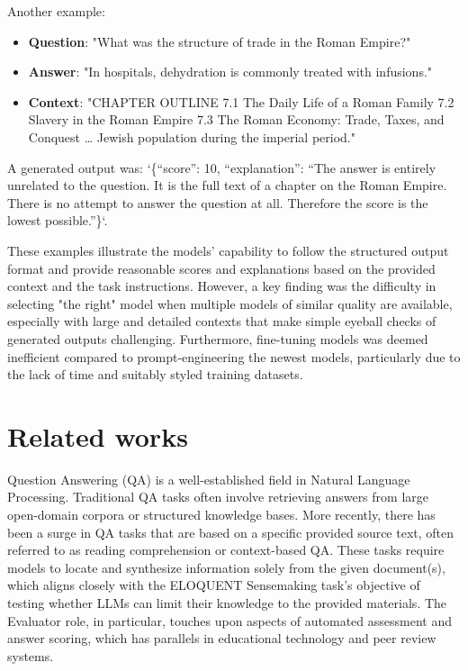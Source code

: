 \documentclass[fleqn,10pt]{olplainarticle}
\begin{document}
Another example:
\begin{itemize}
    \item \textbf{Question}: "What was the structure of trade in the Roman Empire?"
    \item \textbf{Answer}: "In hospitals, dehydration is commonly treated with infusions."
    \item \textbf{Context}: "CHAPTER OUTLINE 7.1 The Daily Life of a Roman Family 7.2 Slavery in the Roman Empire 7.3 The Roman Economy: Trade, Taxes, and Conquest … Jewish population during the imperial period."
\end{itemize}
A generated output was: `\{“score”: 10, “explanation”: “The answer is entirely unrelated to the question. It is the full text of a chapter on the Roman Empire. There is no attempt to answer the question at all. Therefore the score is the lowest possible.”\}`.

These examples illustrate the models' capability to follow the structured output format and provide reasonable scores and explanations based on the provided context and the task instructions. However, a key finding was the difficulty in selecting "the right" model when multiple models of similar quality are available, especially with large and detailed contexts that make simple eyeball checks of generated outputs challenging. Furthermore, fine-tuning models was deemed inefficient compared to prompt-engineering the newest models, particularly due to the lack of time and suitably styled training datasets.


\section*{Related works}

Question Answering (QA) is a well-established field in Natural Language Processing. Traditional QA tasks often involve retrieving answers from large open-domain corpora or structured knowledge bases. More recently, there has been a surge in QA tasks that are based on a specific provided source text, often referred to as reading comprehension or context-based QA. These tasks require models to locate and synthesize information solely from the given document(s), which aligns closely with the ELOQUENT Sensemaking task's objective of testing whether LLMs can limit their knowledge to the provided materials. The Evaluator role, in particular, touches upon aspects of automated assessment and answer scoring, which has parallels in educational technology and peer review systems.
\end{document}

